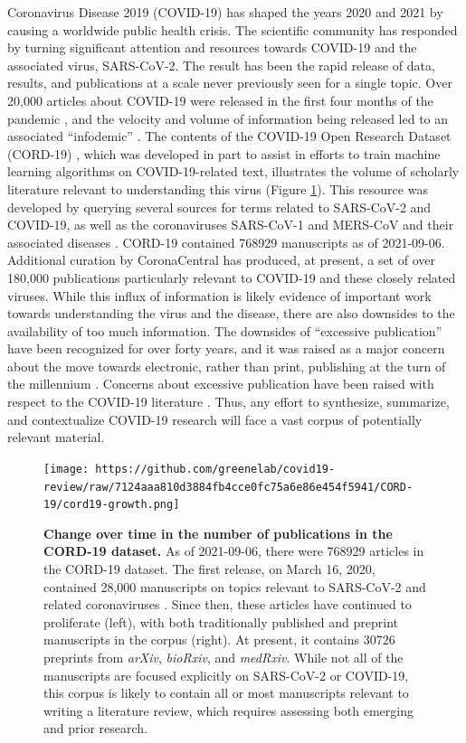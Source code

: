 \documentclass[twocolumn]{ceurart}
\begin{document}
Coronavirus Disease 2019 (COVID-19) has shaped the years 2020 and 2021 by causing a worldwide public health crisis.
The scientific community has responded by turning significant attention and resources towards COVID-19 and the associated virus, SARS-CoV-2.
The result has been the rapid release of data, results, and publications at a scale never previously seen for a single topic.
Over 20,000 articles about COVID-19 were released in the first four months of the pandemic \citep{7ub6VM4Z}, and the velocity and volume of information being released led to an associated ``infodemic'' \citep{7ub6VM4Z, nnfOazAC}.
The contents of the COVID-19 Open Research Dataset (CORD-19) \citep{CiOwklc6}, which was developed in part to assist in efforts to train machine learning algorithms on COVID-19-related text, illustrates the volume of scholarly literature relevant to understanding this virus (Figure \ref{fig:cord19-growth}).
This resource was developed by querying several sources for terms related to SARS-CoV-2 and COVID-19, as well as the coronaviruses SARS-CoV-1 and MERS-CoV and their associated diseases \citep{CiOwklc6}.
CORD-19 contained 768929 manuscripts as of 2021-09-06.
Additional curation by CoronaCentral \citep{zQ1JIn2J} has produced, at present, a set of over 180,000 publications particularly relevant to COVID-19 and these closely related viruses.
While this influx of information is likely evidence of important work towards understanding the virus and the disease, there are also downsides to the availability of too much information.
The downsides of ``excessive publication'' have been recognized for over forty years, and it was raised as a major concern about the move towards electronic, rather than print, publishing at the turn of the millennium \citep{DfSr1Ohc}.
Concerns about excessive publication have been raised with respect to the COVID-19 literature \citep{dUvvJvv6}.
Thus, any effort to synthesize, summarize, and contextualize COVID-19 research will face a vast corpus of potentially relevant material.

\begin{figure}
\hypertarget{fig:cord19-growth}{%
\centering
\texttt{[image: https://github.com/greenelab/covid19-review/raw/7124aaa810d3884fb4cce0fc75a6e86e454f5941/CORD-19/cord19-growth.png]}
\caption{\textbf{Change over time in the number of publications in the CORD-19 dataset.}
As of 2021-09-06, there were 768929 articles in the CORD-19 dataset.
The first release, on March 16, 2020, contained 28,000 manuscripts on topics relevant to SARS-CoV-2 and related coronaviruses \citep{CiOwklc6}.
Since then, these articles have continued to proliferate (left), with both traditionally published and preprint manuscripts in the corpus (right).
At present, it contains 30726 preprints from \emph{arXiv}, \emph{bioRxiv}, and \emph{medRxiv}.
While not all of the manuscripts are focused explicitly on SARS-CoV-2 or COVID-19, this corpus is likely to contain all or most manuscripts relevant to writing a literature review, which requires assessing both emerging and prior research.}\label{fig:cord19-growth}
}
\end{figure}
\end{document}
